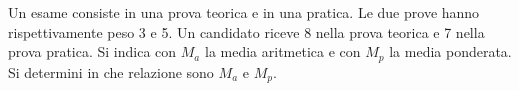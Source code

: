 Un esame consiste in una prova teorica e in una pratica. 
Le due prove hanno rispettivamente peso 3 e 5. 
Un candidato riceve 8 nella prova teorica e 7 nella prova pratica. 
Si indica con $M_a$ la media aritmetica e con $M_p$ 
la media ponderata. 
Si determini in che relazione sono $M_a$ e $M_p$.